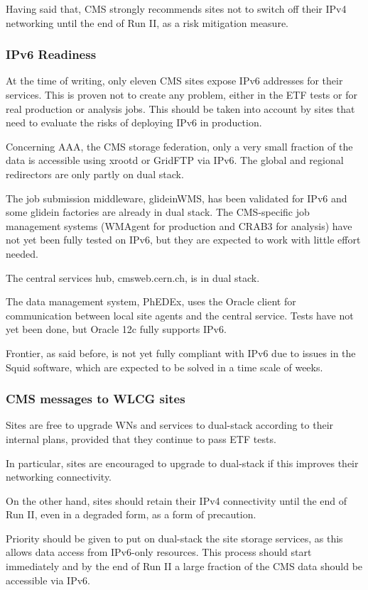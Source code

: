 \documentclass[11pt]{article}
\begin{document}
Having said that, CMS strongly recommends sites not to switch off their IPv4 networking until the end of Run II, as a risk mitigation measure.

\subsubsection{IPv6 Readiness}
At the time of writing, only eleven CMS sites expose IPv6 addresses
for their services. This is proven not to create any problem, either
in the ETF tests or for real production or analysis jobs. This should
be taken into account by sites that need to evaluate the risks of
deploying IPv6 in production.

Concerning AAA, the CMS storage federation, only a very small fraction
of the data is accessible using xrootd or GridFTP via IPv6. The global
and regional redirectors are only partly on dual stack.

The job submission middleware, glideinWMS, has been validated for IPv6
and some glidein factories are already in dual stack. The CMS-specific
job management systems (WMAgent for production and CRAB3 for analysis)
have not yet been fully tested on IPv6, but they are expected to work
with little effort needed.

The central services hub, cmsweb.cern.ch, is in dual stack.

The data management system, PhEDEx, uses the Oracle client for
communication between local site agents and the central service. Tests
have not yet been done, but Oracle 12c fully supports IPv6.

Frontier, as said before, is not yet fully compliant with IPv6 due to
issues in the Squid software, which are expected to be solved in a
time scale of weeks.

\subsubsection{CMS messages to WLCG sites}
Sites are free to upgrade WNs and services to dual-stack according to
their internal plans, provided that they continue to pass ETF tests.

In particular, sites are encouraged to upgrade to dual-stack if this
improves their networking connectivity.

On the other hand, sites should retain their IPv4 connectivity until
the end of Run II, even in a degraded form, as a form of precaution.

Priority should be given to put on dual-stack the site storage services, as
this allows data access from IPv6-only resources. This process should
start immediately and by the end of Run II a large fraction of the CMS
data should be accessible via IPv6.
\end{document}
